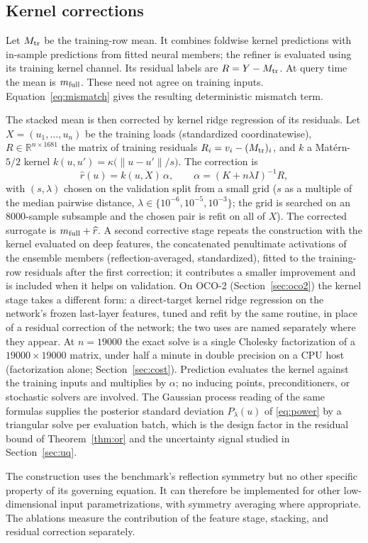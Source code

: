 \subsection{Kernel corrections}
\label{sec:method-kernel}
Let $M_{\rm tr}$ be the training-row mean. It combines foldwise kernel predictions with in-sample predictions from fitted neural members; the refiner is evaluated using its training kernel channel. Its residual labels are $R=Y-M_{\rm tr}$. At query time the mean is $m_{\rm full}$. These need not agree on training inputs. Equation~\eqref{eq:mismatch} gives the resulting deterministic mismatch term.

The stacked mean is then corrected by kernel ridge regression of its
residuals. Let $X=(u_1,\dots,u_n)$ be the training loads (standardized
coordinatewise), $R\in\mathbb R^{n\times1681}$ the matrix of training
residuals $R_i=v_i-(M_{\rm tr})_i$, and $k$ a Mat\'ern-$5/2$ kernel
$k(u,u')=\kappa\big(\|u-u'\|/s\big)$. The correction is
\[
\widehat r(u)=k(u,X)\,\alpha,\qquad \alpha=(K+n\lambda I)^{-1}R ,
\]
with $(s,\lambda)$ chosen on the validation split from a small grid ($s$ as a
multiple of the median pairwise distance, $\lambda\in\{10^{-6},10^{-5},10^{-3}\}$;
the grid is searched on an 8000-sample subsample and the chosen pair is refit
on all of $X$). The corrected surrogate is $m_{\rm full}+\widehat r$. A second corrective
stage repeats the construction with the kernel evaluated on deep features,
the concatenated penultimate activations of the ensemble members
(reflection-averaged, standardized), fitted to the training-row residuals after the first correction; it contributes a smaller improvement and is included when it helps on
validation. On OCO-2 (Section~\ref{sec:oco2}) the kernel stage takes a
different form: a direct-target kernel ridge regression on the network's
frozen last-layer features, tuned and refit by the same routine, in place of
a residual correction of the network; the two uses are named separately
where they appear. At $n=19000$ the exact solve is a single Cholesky factorization
of a $19000\times19000$ matrix, under half a minute in double precision on a
CPU host (factorization alone; Section~\ref{sec:cost}). Prediction
evaluates the kernel against the training inputs and multiplies by $\alpha$;
no inducing points, preconditioners, or stochastic solvers are
involved. The Gaussian process
reading of the same formulas supplies the posterior standard deviation
$P_\lambda(u)$ of \eqref{eq:power} by a triangular solve per evaluation batch, which is the design factor in the residual
bound of Theorem~\ref{thm:or} and the uncertainty signal studied in
Section~\ref{sec:uq}.

The construction uses the benchmark's reflection symmetry but no other
specific property of its governing equation. It can therefore be implemented
for other low-dimensional input parametrizations, with symmetry averaging
where appropriate. The ablations measure the contribution of the feature
stage, stacking, and residual correction separately.

